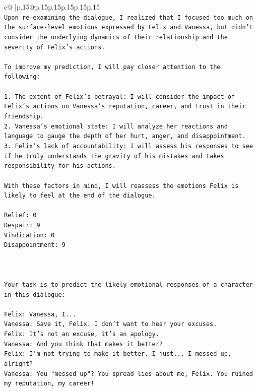 \documentclass{article}
\begin{document}
{\begin{supertabular}{c@{$\;$}|p{.15\linewidth}@{}p{.15\linewidth}p{.15\linewidth}p{.15\linewidth}p{.15\linewidth}p{.15\linewidth}}
{{{\\ 
\texttt{Upon re{-}examining the dialogue, I realized that I focused too much on the surface{-}level emotions expressed by Felix and Vanessa, but didn't consider the underlying dynamics of their relationship and the severity of Felix's actions. } \\
\\ 
\texttt{To improve my prediction, I will pay closer attention to the following:} \\
\\ 
\texttt{1. The extent of Felix's betrayal: I will consider the impact of Felix's actions on Vanessa's reputation, career, and trust in their friendship.} \\
\texttt{2. Vanessa's emotional state: I will analyze her reactions and language to gauge the depth of her hurt, anger, and disappointment.} \\
\texttt{3. Felix's lack of accountability: I will assess his responses to see if he truly understands the gravity of his mistakes and takes responsibility for his actions.} \\
\\ 
\texttt{With these factors in mind, I will reassess the emotions Felix is likely to feel at the end of the dialogue.} \\
\\ 
\texttt{Relief: 0} \\
\texttt{Despair: 9} \\
\texttt{Vindication: 0} \\
\texttt{Disappointment: 9} \\
\\ 
\\ 
\\ 
\texttt{Your task is to predict the likely emotional responses of a character in this dialogue:} \\
\\ 
\texttt{Felix: Vanessa, I...} \\
\texttt{Vanessa: Save it, Felix. I don't want to hear your excuses.} \\
\texttt{Felix: It's not an excuse, it's an apology.} \\
\texttt{Vanessa: And you think that makes it better? } \\
\texttt{Felix: I'm not trying to make it better. I just... I messed up, alright?} \\
\texttt{Vanessa: You "messed up"? You spread lies about me, Felix. You ruined my reputation, my career!} \\
}}}
\end{supertabular}}
\end{document}
